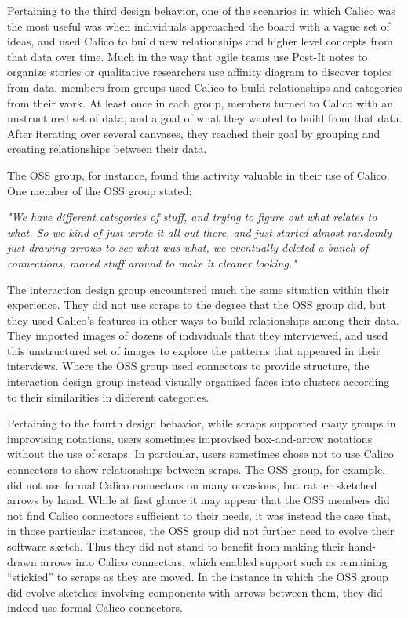 Pertaining to the third design behavior, one of the scenarios in which Calico was the most useful was when individuals approached the board with a vague set of ideas, and used Calico to build new relationships and higher level concepts from that data over time. Much in the way that agile teams use Post-It notes to organize stories or qualitative researchers use affinity diagram to discover topics from data, members from groups used Calico to build relationships and categories from their work. At least once in each group, members turned to Calico with an unstructured set of data, and a goal of what they wanted to build from that data. After iterating over several canvases, they reached their goal by grouping and creating relationships between their data. 

The OSS group, for instance, found this activity valuable in their use of Calico. One member of the OSS group stated:

\begin{myindentpar}{1cm}
\emph{"We have different categories of stuff, and trying to figure out what relates to what. So we kind of just wrote it all out there, and just started almost randomly just drawing arrows to see what was what, we eventually deleted a bunch of connections, moved stuff around to make it cleaner looking."}
\end{myindentpar}

The interaction design group encountered much the same situation within their experience. They did not use scraps to the degree that the OSS group did, but they used Calico's features in other ways to build relationships among their data. They imported images of dozens of individuals that they interviewed, and used this unstructured set of images to explore the patterns that appeared in their interviews. Where the OSS group used connectors to provide structure, the interaction design group instead visually organized faces into clusters according to their similarities in different categories. 

Pertaining to the fourth design behavior, while scraps supported many groups in improvising notations, users sometimes improvised box-and-arrow notations without the use of scraps. In particular, users sometimes chose not to use Calico connectors to show relationships between scraps. The OSS group, for example, did not use formal Calico connectors on many occasions, but rather sketched arrows by hand. While at first glance it may appear that the OSS members did not find Calico connectors sufficient to their needs, it was instead the case that, in those particular instances, the OSS group did not further need to evolve their software sketch. Thus they did not stand to benefit from making their hand-drawn arrows into Calico connectors, which enabled support such as remaining ``stickied'' to scraps as they are moved. In the instance in which the OSS group did evolve sketches involving components with arrows between them, they did indeed use formal Calico connectors. 


